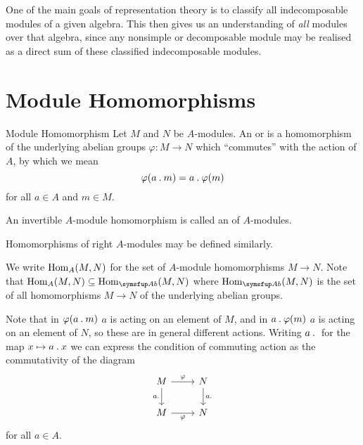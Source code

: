 One of the main goals of representation theory is to classify all indecomposable modules of a given algebra.
This then gives us an understanding of \emph{all} modules over that algebra, since any nonsimple or decomposable module may be realised as a direct sum of these classified indecomposable modules.

\section{Module Homomorphisms}
\begin{dfn}{Module Homomorphism}{}
    Let \(M\) and \(N\) be \(A\)-modules.
    An  or  is a homomorphism of the underlying abelian groups \(\varphi \colon M \to N\) which \enquote{commutes} with the action of \(A\), by which we mean
    \begin{equation}
        \varphi(a \mathbin{.} m) = a \mathbin{.} \varphi(m)
    \end{equation}
    for all \(a \in A\) and \(m \in M\).
    
    An invertible \(A\)-module homomorphism is called an  of \(A\)-modules.
    
    Homomorphisms of right \(A\)-modules may be defined similarly.
\end{dfn}

\begin{ntn}{}{}
    We write \(\operatorname{Hom}_A(M, N)\) for the set of \(A\)-module homomorphisms \(M \to N\).
    Note that \(\Hom_A(M, N) \subseteq \Hom_{\Ab}(M, N)\) where \(\Hom_{\Ab}(M, N)\) is the set of all homomorphisms \(M \to N\) of the underlying abelian groups.
\end{ntn}

Note that in \(\varphi(a \mathbin{.} m)\) \(a\) is acting on an element of \(M\), and in \(a \mathbin{.} \varphi(m)\) \(a\) is acting on an element of \(N\), so these are in general different actions.
Writing \(a \mathbin{.} {}\) for the map \(x \mapsto a \mathbin{.} x\) we can express the condition of commuting action as the commutativity of the diagram
\begin{equation}
    \begin{tikzcd}
        M \arrow[r, "\varphi"] \arrow[d, "a \action {}"'] & N \arrow[d, "a \action {}"]\\
        M \arrow[r, "\varphi"'] & N
    \end{tikzcd}
\end{equation}
for all \(a \in A\).

